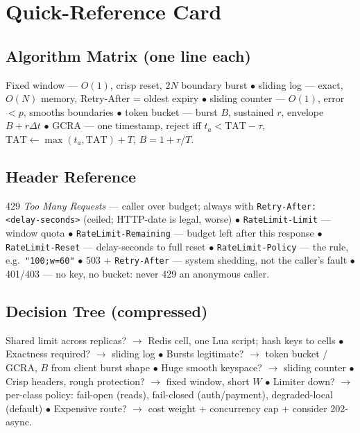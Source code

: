 \section{Quick-Reference Card}
\label{sec:ch14-quickref}

\subsection*{Algorithm Matrix (one line each)}
Fixed window --- $O(1)$, crisp reset, $2N$ boundary burst $\bullet$
sliding log --- exact, $O(N)$ memory, Retry-After = oldest expiry $\bullet$
sliding counter --- $O(1)$, error $< p$, smooths boundaries $\bullet$
token bucket --- burst $B$, sustained $r$, envelope $B + r\Delta t$
$\bullet$ GCRA --- one timestamp, reject iff $t_a < \mathrm{TAT} - \tau$,
$\mathrm{TAT} \leftarrow \max(t_a, \mathrm{TAT}) + T$, $B = 1 + \tau/T$.

\subsection*{Header Reference}
429 \emph{Too Many Requests} --- caller over budget; always with
\texttt{Retry-After: <delay-seconds>} (ceiled; HTTP-date is legal, worse)
$\bullet$ \texttt{RateLimit-Limit} --- window quota $\bullet$
\texttt{RateLimit-Remaining} --- budget left after this response $\bullet$
\texttt{RateLimit-Reset} --- delay-seconds to full reset $\bullet$
\texttt{RateLimit-Policy} --- the rule, e.g.\ \texttt{"100;w=60"} $\bullet$
503 + \texttt{Retry-After} --- system shedding, not the caller's fault
$\bullet$ 401/403 --- no key, no bucket: never 429 an anonymous caller.

\subsection*{Decision Tree (compressed)}
Shared limit across replicas? $\to$ Redis cell, one Lua script; hash keys
to cells $\bullet$ Exactness required? $\to$ sliding log $\bullet$ Bursts
legitimate? $\to$ token bucket / GCRA, $B$ from client burst shape $\bullet$
Huge smooth keyspace? $\to$ sliding counter $\bullet$ Crisp headers, rough
protection? $\to$ fixed window, short $W$ $\bullet$ Limiter down? $\to$
per-class policy: fail-open (reads), fail-closed (auth/payment),
degraded-local (default) $\bullet$ Expensive route? $\to$ cost weight +
concurrency cap + consider 202-async.


